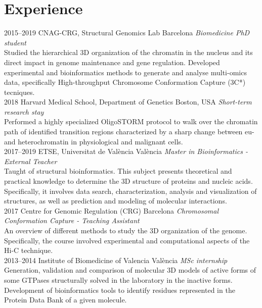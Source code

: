 \documentclass[]{friggeri-cv} %
\begin{document}

\section{Experience}

\begin{entrylist}

\entry
{2015--2019}
{CNAG-CRG, Structural Genomics Lab}
{Barcelona}
{\emph{Biomedicine PhD student}\\
Studied the hierarchical 3D organization of the chromatin in the nucleus and its direct impact in genome maintenance and gene regulation.
Developed experimental and bioinformatics methods to
generate and analyse multi-omics data, specifically
High-throughput Chromosome Conformation Capture (3C*) tecniques.
}\\

\entry
{2018}
{Harvard Medical School, Department of Genetics}
{Boston, USA}
{\emph{Short-term research stay}\\
Performed a highly specialized
OligoSTORM protocol to walk over the chromatin path of identified
transition regions characterized by a sharp change between eu- and heterochromatin in physiological and malignant cells.
}\\

\entry
{2017--2019}
{ETSE, Universitat de València}
{València}
{\emph{Master in Bioinformatics - External Teacher}\\
Taught of structural bioinformatics. This subject presents theoretical and practical knowledge to
determine the 3D structure of proteins and nucleic acids. Specifically, it involves
data search, characterization, analysis and visualization of structures,
as well as prediction and modeling of molecular interactions.}\\
\entry
{2017}
{Centre for Genomic Regulation (CRG)}
{Barcelona}
{\emph {Chromosomal Conformation Capture - Teaching Assistant} \\
An overview of different methods to study the 3D organization of the genome. Specifically, the course involved experimental and computational aspects of the Hi-C technique.}\\
\entry
{2013--2014}
{Institute of Biomedicine of Valencia}
{València}
{\emph {MSc internship}
Generation, validation and comparison of molecular 3D models of active forms of some GTPases
structurally solved in the laboratory in the inactive forms. Development of bioinformatics tools to identify residues represented in the Protein Data Bank of a given molecule.}
\end{entrylist}
\end{document}
